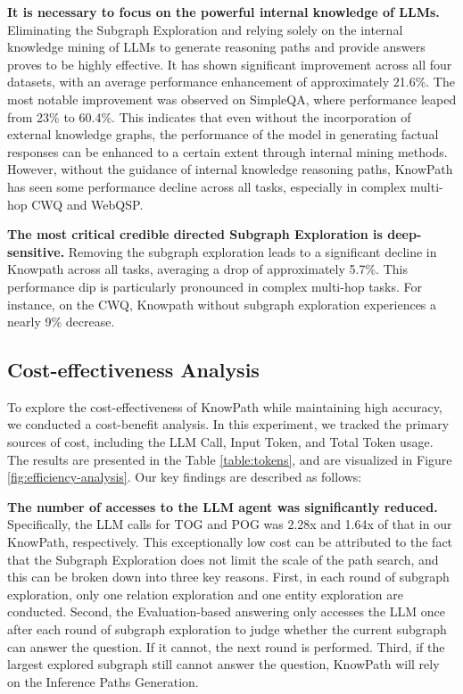 \textbf{It is necessary to focus on the powerful internal knowledge of LLMs.}
Eliminating the Subgraph Exploration and relying solely on the internal knowledge mining of LLMs to generate reasoning paths and provide answers proves to be highly effective. 
It has shown significant improvement across all four datasets, with an average performance enhancement of approximately 21.6\%. The most notable improvement was observed on SimpleQA, where performance leaped from 23\% to 60.4\%.
This indicates that even without the incorporation of external knowledge graphs, the performance of the model in generating factual responses can be enhanced to a certain extent through internal mining methods.
However, without the guidance of internal knowledge reasoning paths, KnowPath has seen some performance decline across all tasks, especially in complex multi-hop CWQ and WebQSP.


\textbf{The most critical credible directed Subgraph Exploration is deep-sensitive.}
Removing the subgraph exploration leads to a significant decline in Knowpath across all tasks, averaging a drop of approximately 5.7\%. This performance dip is particularly pronounced in complex multi-hop tasks. For instance, on the CWQ, Knowpath without subgraph exploration experiences a nearly 9\% decrease.






\subsection{Cost-effectiveness Analysis}

To explore the cost-effectiveness of KnowPath while maintaining high accuracy, we conducted a cost-benefit analysis. In this experiment, we tracked the primary sources of cost, including the LLM Call, Input Token, and Total Token usage. The results are presented in the Table \ref{table:tokens}, and are visualized in Figure \ref{fig:efficiency-analysis}.
Our key findings are described as follows:


\textbf{The number of accesses to the LLM agent was significantly reduced.} Specifically, the LLM calls for TOG and POG was 2.28x and 1.64x of that in our KnowPath, respectively.
This exceptionally low cost can be attributed to the fact that the Subgraph Exploration does not limit the scale of the path search, and this can be broken down into three key reasons. First, in each round of subgraph exploration, only one relation exploration and one entity exploration are conducted. Second, the Evaluation-based answering only accesses the LLM once after each round of subgraph exploration to judge whether the current subgraph can answer the question. If it cannot, the next round is performed. Third, if the largest explored subgraph still cannot answer the question, KnowPath will rely on the Inference Paths Generation.



